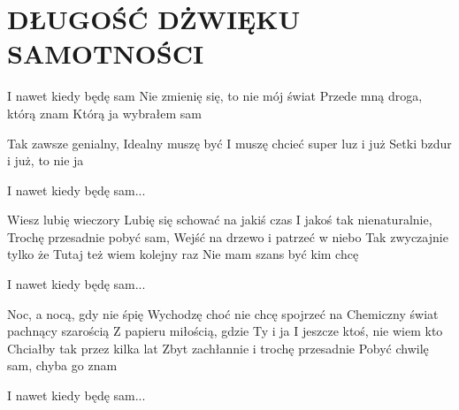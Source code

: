 \documentclass[../../../songbook.tex]{subfiles}
\begin{document}
\TabPositions{8cm} %
\section*{DŁUGOŚĆ DŻWIĘKU SAMOTNOŚCI}
{}
\vspace{0.5cm}
\-\hspace{1cm} I nawet kiedy będę sam		 	 \newline	
\-\hspace{1cm} Nie zmienię się, to nie mój świat	 \newline
\-\hspace{1cm} Przede mną droga, którą znam		 \newline
\-\hspace{1cm} Którą ja wybrałem sam		 \newline

Tak zawsze genialny,					 \newline
Idealny muszę być						 \newline
I muszę chcieć super luz i już 			 \newline
Setki bzdur i już, to nie ja			 \newline	

\-\hspace{1cm} I nawet kiedy będę sam...		 \newline

Wiesz lubię wieczory		 \newline
Lubię się schować na jakiś czas		 \newline
I jakoś tak nienaturalnie, 		 \newline
Trochę przesadnie pobyć sam, 		 \newline
Wejść na drzewo i patrzeć w niebo 		 \newline
Tak zwyczajnie tylko że		 \newline
Tutaj też wiem kolejny raz		 \newline
Nie mam szans być kim chcę		 \newline

\-\hspace{1cm} I nawet kiedy będę sam...		 \newline

Noc, a nocą, gdy nie śpię		 \newline
Wychodzę choć nie chcę spojrzeć na 		 \newline
Chemiczny świat pachnący szarością 		 \newline
Z papieru miłością, gdzie Ty i ja		 \newline
I jeszcze ktoś, nie wiem kto		 \newline
Chciałby tak przez kilka lat		 \newline
Zbyt zachłannie i trochę przesadnie		 \newline
Pobyć chwilę sam, chyba go znam		 \newline

\-\hspace{1cm} I nawet kiedy będę sam...		 \newline
\end{document}
